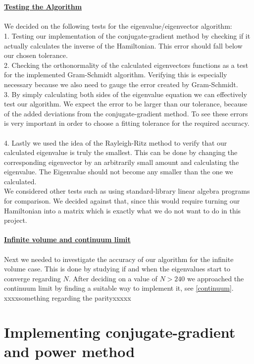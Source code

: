 \documentclass[11pt, letterpaper, onecolumn]{article}
\begin{document}
    \\
    \\
        \underline{\textbf{Testing the Algorithm}}
    \\
    \\
    We decided on the following tests for the eigenvalue/eigenvector algorithm:\\
    1. Testing our implementation of the conjugate-gradient method by checking if it actually calculates the inverse of the Hamiltonian. This error should fall below our chosen tolerance. \\
    2. Checking the orthonormality of the calculated eigenvectors functions as a test for the implemented Gram-Schmidt algorithm. Verifying this is especially necessary because we also need to gauge the error created by Gram-Schmidt.\\
    3. By simply calculating both sides of the eigenvalue equation we can effectively test our algorithm. We expect the error to be larger than our tolerance, because of the added deviations from the conjugate-gradient method. To see these errors is very important in order to choose a fitting tolerance for the required accuracy.\\
    \\
    4. Lastly we used the idea of the Rayleigh-Ritz method to verify that our calculated eigenvalue is truly the smallest. This can be done by changing the corresponding eigenvector by an arbitrarily small amount and calculating the eigenvalue. The Eigenvalue should not become any smaller than the one we calculated.\\
    We considered other tests such as using standard-library linear algebra programs for comparison. We decided against that, since this would require turning our Hamiltonian into a matrix which is exactly what we do not want to do in this project. 
    \\
    \\
        \underline{\textbf{Infinite volume and continuum limit}}
    \\
    \\   
    Next we needed to investigate the accuracy of our algorithm for the infinite volume case. This is done by studying if and when the eigenvalues start to converge regarding $N$. After deciding on a value of $N>240$ we approached the continuum limit by finding a suitable way to implement it, see \ref{continuum}. xxxxsomething regarding the parityxxxxx
	
	
	\section{Implementing conjugate-gradient and power method}
	
\end{document}
